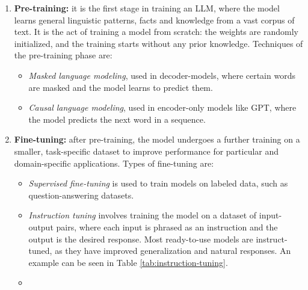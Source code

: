 \begin{enumerate}
    \item \textbf{Pre-training:} it is the first stage in training an LLM, where the model learns general linguistic patterns, facts and knowledge from a vast corpus of text. It is the act of training a model from scratch: the weights are randomly initialized, and the training starts without any prior knowledge. Techniques of the pre-training phase are:
    \begin{itemize}
        \item \textit{Masked language modeling}, used in decoder-models, where certain words are masked and the model learns to predict them. \cite{devlin2019bert}
        \item \textit{Causal language modeling}, used in encoder-only models like GPT, where the model predicts the next word in a sequence. \cite{brown2020language}
    \end{itemize}
    \item \textbf{Fine-tuning:} after pre-training, the model undergoes a further training on a smaller, task-specific dataset to improve performance for particular and domain-specific applications. Types of fine-tuning are:
    \begin{itemize}
        \item \textit{Supervised fine-tuning} is used to train models on labeled data, such as question-answering datasets.
        \item \textit{Instruction tuning} involves training the model on a dataset of input-output pairs, where each input is phrased as an instruction and the output is the desired response. Most ready-to-use models are instruct-tuned, as they have improved generalization and natural responses. An example can be seen in Table \ref{tab:instruction-tuning}.
        \item {}
    \end{itemize}
\end{enumerate}

